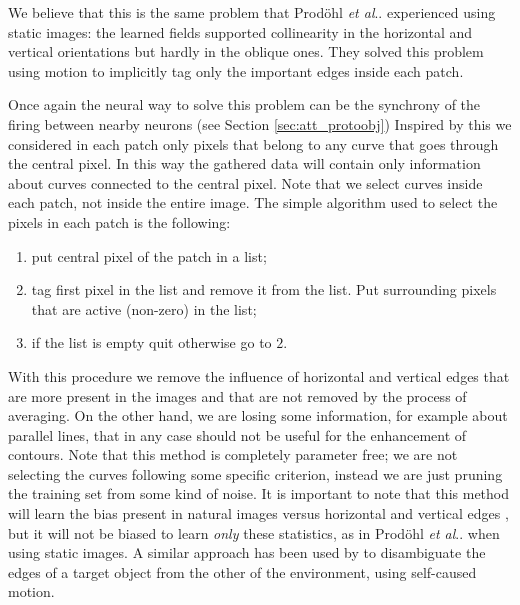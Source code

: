\documentclass{llncs}
\makeatletter
\DeclareRobustCommand\onedot{\futurelet\@let@token\@onedot}
\def\@onedot{\ifx\@let@token.\else.\null\fi\xspace}
\def\etal{\emph{et al}\onedot}
\makeatother
\begin{document}


We believe that this is the same problem that Prod\"ohl \etal \cite{Prodohl01} experienced using static images: the learned fields supported collinearity in the horizontal and vertical orientations but hardly in the oblique ones. They solved this problem using motion to implicitly tag only the important edges inside each patch.

Once again the neural way to solve this problem can be the synchrony of the
firing between nearby neurons (see Section \ref{sec:att_protoobj})
Inspired by this we considered in each patch only pixels that belong to any
curve that goes through the central pixel. In this way the gathered data will
contain only information about curves connected to the central pixel.
Note that we select curves inside each patch, not inside the entire image.
The simple algorithm used to select the pixels in each patch is the following:
\begin{enumerate}
	\item put central pixel of the patch in a list;
	\item tag first pixel in the list and remove it from the list. Put surrounding pixels that are active (non-zero) in the list;
	\item if the list is empty quit otherwise go to $2$.
\end{enumerate}
With this procedure we remove the influence of horizontal and vertical edges that are more present in the images and
that are not removed by the process of averaging. On the other hand, we are losing some information, for example about parallel lines, that in any case should not be useful for the enhancement of contours.
Note that this method is completely parameter free; we are not selecting the curves following some specific criterion, instead we are just pruning the training set from some kind of noise.
It is important to note that this method will learn the bias present in natural images versus horizontal and vertical edges \cite{CoppolaPMP98}, but it will not be biased to learn \emph{only} these statistics, as in Prod\"ohl \etal \cite{Prodohl01} when using static images.
A similar approach has been used by \cite{Fitzpatrick03} to disambiguate the edges of a target object from the other of the environment, using self-caused motion.
\end{document}
